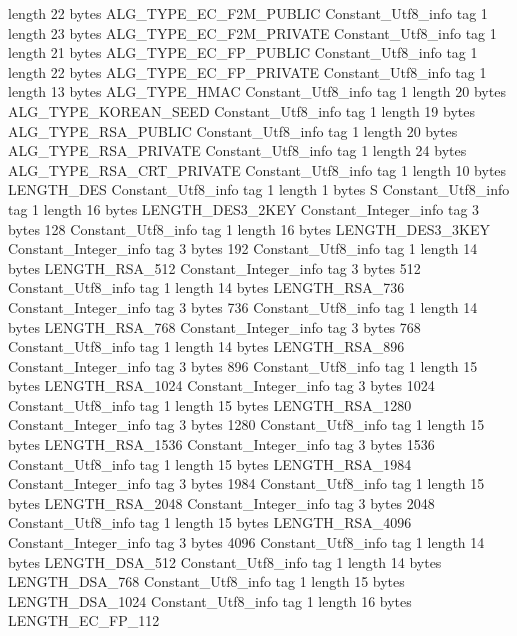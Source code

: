 {{{			length	22
			bytes	ALG_TYPE_EC_F2M_PUBLIC
		}
		Constant_Utf8_info {
			tag	1
			length	23
			bytes	ALG_TYPE_EC_F2M_PRIVATE
		}
		Constant_Utf8_info {
			tag	1
			length	21
			bytes	ALG_TYPE_EC_FP_PUBLIC
		}
		Constant_Utf8_info {
			tag	1
			length	22
			bytes	ALG_TYPE_EC_FP_PRIVATE
		}
		Constant_Utf8_info {
			tag	1
			length	13
			bytes	ALG_TYPE_HMAC
		}
		Constant_Utf8_info {
			tag	1
			length	20
			bytes	ALG_TYPE_KOREAN_SEED
		}
		Constant_Utf8_info {
			tag	1
			length	19
			bytes	ALG_TYPE_RSA_PUBLIC
		}
		Constant_Utf8_info {
			tag	1
			length	20
			bytes	ALG_TYPE_RSA_PRIVATE
		}
		Constant_Utf8_info {
			tag	1
			length	24
			bytes	ALG_TYPE_RSA_CRT_PRIVATE
		}
		Constant_Utf8_info {
			tag	1
			length	10
			bytes	LENGTH_DES
		}
		Constant_Utf8_info {
			tag	1
			length	1
			bytes	S
		}
		Constant_Utf8_info {
			tag	1
			length	16
			bytes	LENGTH_DES3_2KEY
		}
		Constant_Integer_info {
			tag	3
			bytes	128
		}
		Constant_Utf8_info {
			tag	1
			length	16
			bytes	LENGTH_DES3_3KEY
		}
		Constant_Integer_info {
			tag	3
			bytes	192
		}
		Constant_Utf8_info {
			tag	1
			length	14
			bytes	LENGTH_RSA_512
		}
		Constant_Integer_info {
			tag	3
			bytes	512
		}
		Constant_Utf8_info {
			tag	1
			length	14
			bytes	LENGTH_RSA_736
		}
		Constant_Integer_info {
			tag	3
			bytes	736
		}
		Constant_Utf8_info {
			tag	1
			length	14
			bytes	LENGTH_RSA_768
		}
		Constant_Integer_info {
			tag	3
			bytes	768
		}
		Constant_Utf8_info {
			tag	1
			length	14
			bytes	LENGTH_RSA_896
		}
		Constant_Integer_info {
			tag	3
			bytes	896
		}
		Constant_Utf8_info {
			tag	1
			length	15
			bytes	LENGTH_RSA_1024
		}
		Constant_Integer_info {
			tag	3
			bytes	1024
		}
		Constant_Utf8_info {
			tag	1
			length	15
			bytes	LENGTH_RSA_1280
		}
		Constant_Integer_info {
			tag	3
			bytes	1280
		}
		Constant_Utf8_info {
			tag	1
			length	15
			bytes	LENGTH_RSA_1536
		}
		Constant_Integer_info {
			tag	3
			bytes	1536
		}
		Constant_Utf8_info {
			tag	1
			length	15
			bytes	LENGTH_RSA_1984
		}
		Constant_Integer_info {
			tag	3
			bytes	1984
		}
		Constant_Utf8_info {
			tag	1
			length	15
			bytes	LENGTH_RSA_2048
		}
		Constant_Integer_info {
			tag	3
			bytes	2048
		}
		Constant_Utf8_info {
			tag	1
			length	15
			bytes	LENGTH_RSA_4096
		}
		Constant_Integer_info {
			tag	3
			bytes	4096
		}
		Constant_Utf8_info {
			tag	1
			length	14
			bytes	LENGTH_DSA_512
		}
		Constant_Utf8_info {
			tag	1
			length	14
			bytes	LENGTH_DSA_768
		}
		Constant_Utf8_info {
			tag	1
			length	15
			bytes	LENGTH_DSA_1024
		}
		Constant_Utf8_info {
			tag	1
			length	16
			bytes	LENGTH_EC_FP_112
}}}
